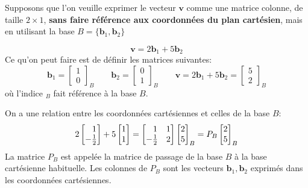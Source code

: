 \documentclass{article}
\begin{document}
\newpage
Supposons que l'on veuille exprimer le vecteur $\mathbf{v}$ comme une matrice colonne, de taille $2\times 1$, \textbf{sans faire référence aux coordonnées du plan cartésien}, mais en utilisant la base
$B = \{\mathbf{b}_1,\mathbf{b}_2\}$


\[
\mathbf{v} = 2\mathbf{b}_1 + 5 \mathbf{b}_2
\]
Ce qu'on peut faire est de définir les matrices
suivantes:
\[
\mathbf{b}_1 = \begin{bmatrix}
1 \\ 0
\end{bmatrix}_B
\qquad
\mathbf{b}_2 = \begin{bmatrix}
0 \\ 1
\end{bmatrix}_B
\qquad
\mathbf{v} = 2\mathbf{b}_1
+ 5 \mathbf{b}_2
=
\begin{bmatrix}
5 \\ 2
\end{bmatrix}_B
\]
où l'indice ${}_B$ fait référence à la base $B$.

On a une relation entre les coordonnées cartésiennes
et celles de la base $B$:
\[
2\begin{bmatrix}
\hphantom{-}1\\ -\frac12
\end{bmatrix} + 5 \begin{bmatrix}
1\\ 1
\end{bmatrix}
=
\begin{bmatrix}
\hphantom{-}1 & 1 \\
-\frac12 & 2
\end{bmatrix}
\begin{bmatrix}
2 \\ 5
\end{bmatrix}_B
=
P_B\begin{bmatrix}
2 \\ 5
\end{bmatrix}_B
\]
La matrice $P_B$ est appelée la matrice de passage de la base $B$ à la base cartésienne habituelle. Les colonnes
de $P_B$ sont les vecteurs $\mathbf{b}_1,\mathbf{b}_2$
exprimés dans les coordonnées cartésiennes.
\end{document}
